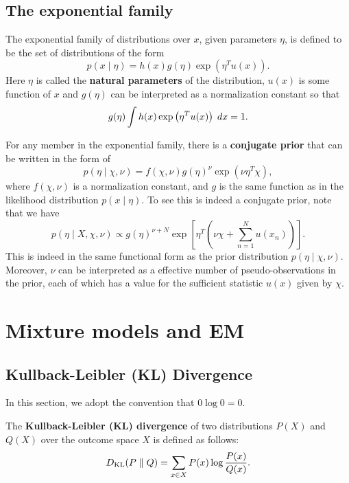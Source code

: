 \documentclass[a4paper]{article}
\begin{document}
\subsection{The exponential family}

\begin{defi}
The exponential family of distributions over $x$, 
given parameters $\eta$, is defined to be the set of 
distributions of the form
\[
p(x \mid \eta) = h(x) g(\eta) \exp \left( \eta^T u(x) 
\right).
\]
Here $\eta$ is called the \textbf{natural parameters}
of the distribution, $u(x)$ is some function of $x$ 
and $g(\eta)$ can be interpreted as a normalization 
constant so that 
\[
g(\eta) \int h(x) \exp \left( \eta^T u(x) \right) \; d x = 1.
\]
\end{defi}

For any member in the exponential family, there is a 
\textbf{conjugate prior} that can be written in the form of 
\[
p(\eta \mid \chi, \nu)
= f(\chi, \nu) g(\eta)^\nu \exp \left( \nu \eta^T \chi 
\right),
\]
where $f(\chi, \nu)$ is a normalization constant, and 
$g$ is the same function as in the likelihood distribution
$p(x \mid \eta)$. To see this is indeed a conjugate prior,
note that we have 
\[
p(\eta \mid X, \chi, \nu) 
\propto g(\eta)^{\nu + N} \exp \left[ \eta^T 
\left( \nu \chi + \sum_{n=1}^N u(x_n) \right) \right].
\]
This is indeed in the same functional form as the 
prior distribution $p(\eta \mid \chi, \nu)$.
Moreover, $\nu$ can be interpreted as a effective number of
pseudo-observations in the prior, each of which has a value 
for the sufficient statistic $u(x)$ given by $\chi$.





\section{Mixture models and EM}

\subsection{Kullback-Leibler (KL) Divergence}
In this section, we adopt the convention that $0 \log 0 = 0$.

\begin{defi}[KL divergence]
  The \textbf{Kullback-Leibler (KL) divergence} of two
  distributions $P(X)$ and $Q(X)$
  over the outcome space $X$ is defined as follows:
  \[
  D_\text{KL} (P \; \Vert \; Q) = \sum_{x \in X} P(x) \log \frac{P(x)}{Q(x)}.
  \]
\end{defi}
\end{document}
